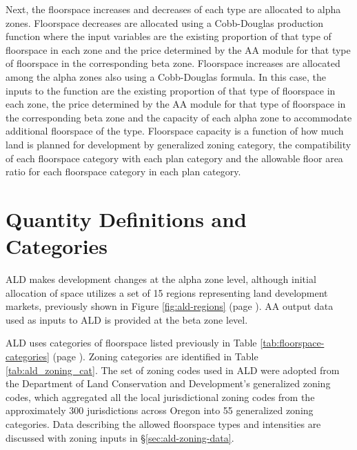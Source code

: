 Next, the floorspace increases and decreases of each type are allocated to alpha zones. Floorspace decreases are allocated using a Cobb-Douglas production function where the input variables are the existing proportion of that type of floorspace in each zone and the price determined by the AA module for that type of floorspace in the corresponding beta zone. Floorspace increases are allocated among the alpha zones also using a Cobb-Douglas formula. In this case, the inputs to the function are the existing proportion of that type of floorspace in each zone, the price determined by the AA module for that type of floorspace in the corresponding beta zone and the capacity of each alpha zone to accommodate additional floorspace of the type. Floorspace capacity is a function of how much land is planned for development by generalized zoning category, the compatibility of each floorspace category with each plan category and the allowable floor area ratio for each floorspace category in each plan category.

\section{Quantity Definitions and Categories}
ALD makes development changes at the alpha zone level, although initial allocation of space utilizes a set of 15 regions representing land development markets, previously shown in Figure \ref{fig:ald-regions} (page \pageref{fig:ald-regions}). AA output data used as inputs to ALD is provided at the beta zone level.

ALD uses categories of floorspace listed previously in Table \ref{tab:floorspace-categories} (page \pageref{tab:floorspace-categories}). Zoning categories are identified in Table \ref{tab:ald_zoning_cat}. The set of zoning codes used in ALD were adopted from the Department of Land Conservation and Development's generalized zoning codes, which aggregated all the local jurisdictional zoning codes from the approximately 300 jurisdictions across Oregon into 55 generalized zoning categories. Data describing the allowed floorspace types and intensities are discussed with zoning inputs in \S\ref{sec:ald-zoning-data}. 


